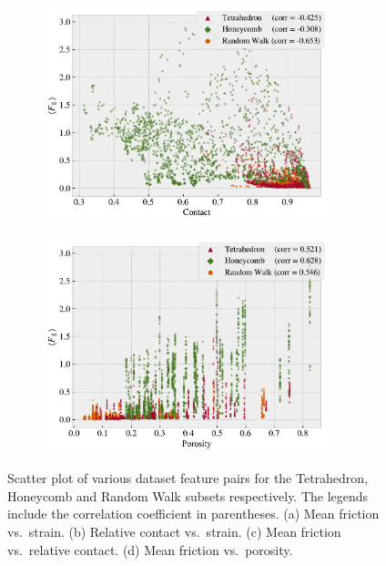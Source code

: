 \begin{figure}[!htb]
\begin{subfigure}[t]{0.49\textwidth}
      \includegraphics[width=0.91\textwidth]{figures/ML/corr_contact_Ff.pdf}
      \caption{}
  \end{subfigure}
  \hfill
  \begin{subfigure}[t]{0.49\textwidth}
      \centering
      \raggedright
      \includegraphics[width=0.91\textwidth]{figures/ML/corr_porosity_Ff.pdf}
      \caption{}
  \end{subfigure}
  \hfill
     \caption{Scatter plot of various dataset feature pairs for the Tetrahedron, Honeycomb and Random Walk subsets respectively. The legends include the correlation coefficient in parentheses. (a) Mean friction vs.\ strain. (b) Relative contact vs.\ strain. (c) Mean friction vs.\ relative contact. (d) Mean friction vs.\ porosity.}
     \label{fig:corr_vis}
\end{figure}


